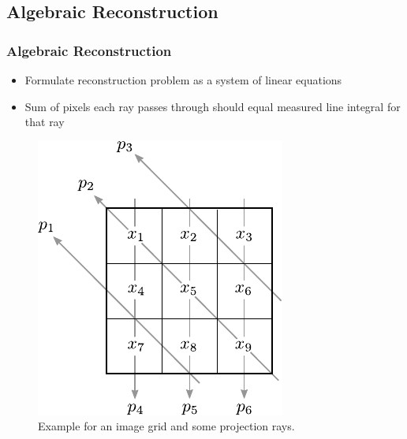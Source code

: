 \subsection{Algebraic Reconstruction}
\label{sub:ct_algebraic}

\begin{frame}
	\frametitle{Algebraic Reconstruction}

	\begin{itemize}
		\item Formulate reconstruction problem as a system of linear equations
		\item Sum of pixels each ray passes through should
		      equal measured line integral for that ray
	\end{itemize}

	\begin{figure}[tbp]
		\centering
		\includegraphics[height=0.6\textheight]{images/algebraic_1}
		\caption{Example for an image grid and some projection rays.}
		\label{fig:ct_algebraic_1}
	\end{figure}
\end{frame}

